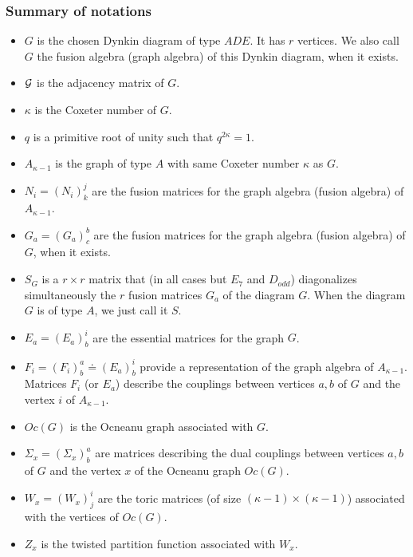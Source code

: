 \documentclass[a4paper,11pt]{article}
\begin{document}
\eject

\subsubsection{Summary of notations}
\begin{itemize}

\item   $G$ is the chosen Dynkin diagram of type $ADE$. It has $r$
vertices. We also call $G$ the fusion algebra (graph algebra) of this
Dynkin diagram, when it exists.

\item  ${\cal G}$  is the adjacency matrix of $G$.

\item  ${\kappa }$ is the Coxeter number of $G$.

\item  $q$ is a primitive root of unity such that $q^{2\kappa}=1$.

\item  $A_{\kappa -1}$ is the graph of type $A$ with same Coxeter number
$\kappa$ as $G$.

\item  $N_{i}=(N_{i})^{j}_{k}$ are the fusion matrices for the graph algebra
(fusion algebra) of $A_{\kappa -1}$.

\item  $G_{a}=(G_{a})^{b}_{c}$ are the fusion matrices for the graph algebra
(fusion algebra) of $G$, when it exists.

\item $S_{G}$ is a $r \times r$ matrix that (in all cases but $E_{7}$
and $D_{odd}$) diagonalizes simultaneously the $r$ fusion matrices $G_{a}$
of the diagram $G$. When the diagram $G$ is of type $A$, we just call
it $S$.

\item  $E_{a} = (E_{a})^{i}_{b}$ are the essential matrices for the graph
$G$.

\item  $F_{i} = (F_{i})^{a}_{b} \doteq (E_{a})^{i}_{b}$ provide a
representation of the graph algebra of $A_{\kappa -1}$.
Matrices $F_i$ (or $E_a$) describe the couplings between vertices
$a,b$ of $G$ and the vertex $i$ of $A_{\kappa -1}$.



\item  $Oc(G)$ is the Ocneanu graph associated with $G$.

\item  $\Sigma_{x} = (\Sigma_{x})^{a}_{b}$ are matrices describing the dual
couplings between vertices $a,b$ of $G$  and the vertex $x$ of
the Ocneanu graph $Oc(G)$.

\item  $W_{x} = (W_{x})^{i}_{j}$ are the toric matrices (of size $(\kappa
-1)\times (\kappa -1)$) associated with the vertices of $Oc(G)$.

\item  $Z_{x}$ is the twisted partition function associated with $W_{x}$.

\end{itemize}
\end{document}
